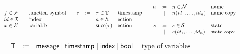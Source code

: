 \documentclass[a4paper]{article}
\theoremstyle{remark}
\begin{document}
\begin{figure}
\[
\begin{array}[t]{ccc}
    \begin{array}{rcl}
    f \in \mathcal{F} & & \text{function symbol}\\
    id \in \mathcal{I}  & & \text{index}\\

    x \in \mathcal{X} & & \text{variable}\\
    \end{array}
&     \begin{array}{rcll}
\tau &:=& \tau \in \mathbb{T}  & \text{timestamp}\\
& \mid & a \in \mathbb{A} & \text{action} \\
& \mid & \textsf{succ}(\tau) & \text{action} \\
\end{array}
   &
    \begin{array}{rcll}

    n &:=& n \in \mathcal{N} & \text{name}\\
    &\mid& n(id_1,\dots,id_n) & \text{name copy} \\
    \\

    s&:=& s \in \mathcal{S} & \text{state}\\
    &\mid& s(id_1,\dots,id_n) & \text{state copy}\\

    \end{array}
\end{array}
\]

\[
  \begin{array}{c}
     \begin{array}{rcll}
    \textsf{T} &  := & \textsf{message} \mid \textsf{timestamp} \mid \textsf{index} \mid \textsf{bool} & \text{
        type of variables} \\

      \\


\end{array}
\end{array}\]
\end{figure}
\end{document}
